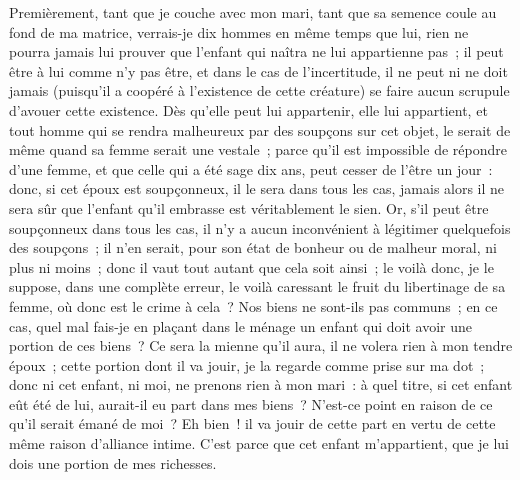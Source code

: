 \documentclass[french,twoside]{book} %
\begin{document}
Premièrement, tant que je couche avec mon mari, tant que sa semence coule au fond de ma matrice, verrais-je dix hommes en même temps que lui, rien ne pourra jamais lui prouver que l’enfant qui naîtra ne lui appartienne pas ; il peut être à lui comme n’y pas être, et dans le cas de l’incertitude, il ne peut ni ne doit jamais (puisqu’il a coopéré à l’existence de cette créature) se faire aucun scrupule d’avouer cette existence. Dès qu’elle peut lui appartenir, elle lui appartient, et tout homme qui se rendra malheureux par des soupçons sur cet objet, le serait de même quand sa femme serait une vestale ; parce qu’il est impossible de répondre d’une femme, et que celle qui a été sage dix ans, peut cesser de l’être un jour : donc, si cet époux est soupçonneux, il le sera dans tous les cas, jamais alors il ne sera sûr que l’enfant qu’il embrasse est véritablement le sien. Or, s’il peut être soupçonneux dans tous les cas, il n’y a aucun inconvénient à légitimer quelquefois des soupçons ; il n’en serait, pour son état de bonheur ou de malheur moral, ni plus ni moins ; donc il vaut tout autant que cela soit ainsi ; le voilà donc, je le suppose, dans une complète erreur, le voilà caressant le fruit du libertinage de sa femme, où donc est le crime à cela ? Nos biens ne sont-ils pas communs ; en ce cas, quel mal fais-je en plaçant dans le ménage un enfant qui doit avoir une portion de ces biens ? Ce sera la mienne qu’il aura, il ne volera rien à mon tendre époux ; cette portion dont il va jouir, je la regarde comme prise sur ma dot ; donc ni cet enfant, ni moi, ne prenons rien à mon mari : à quel titre, si cet enfant eût été de lui, aurait-il eu part dans mes biens ? N’est-ce point en raison de ce qu’il serait émané de moi ? Eh bien ! il va jouir de cette part en vertu de cette même raison d’alliance intime. C’est parce que cet enfant m’appartient, que je lui dois une portion de mes richesses.\par
\end{document}
